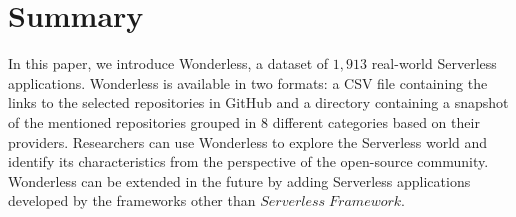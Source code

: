\section{Summary}
\label{summary}

In this paper, we introduce Wonderless, a dataset of $1,913$ 
real-world Serverless applications. Wonderless is available in two 
formats: a CSV file containing the links to the selected repositories 
in GitHub and a directory containing a snapshot of the mentioned 
repositories grouped in 8 different categories based on their providers. 
Researchers can use Wonderless to explore the Serverless world and 
identify its characteristics from the perspective of the open-source 
community. Wonderless can be extended in the future by adding 
Serverless applications developed by the frameworks other than 
$Serverless \; Framework$.

